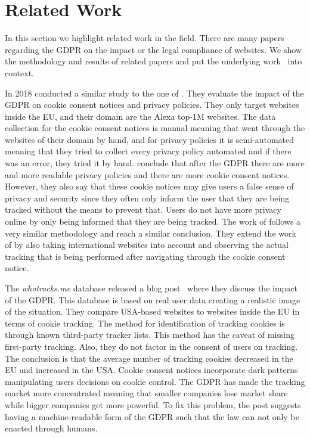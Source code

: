 \section{Related Work}
\label{sec:related}

In this section we highlight related work in the field. There are many papers regarding the GDPR on the impact or
the legal compliance of websites. We show the methodology and results of related papers and put the underlying
work~\cite{sanchez2019can} into context.

In 2018  conducted a similar study to the one of . They evaluate the impact of the
GDPR on cookie consent notices and privacy policies. They only target websites inside the EU, and their domain are the
Alexa top-1M websites. The data collection for the cookie consent notices is manual meaning that
\citeauthor{degeling2018we} went through the websites of their domain by hand, and for privacy policies it is
semi-automated meaning that they tried to collect every privacy policy automated and if there was an error, they tried
it by hand. \citeauthor{degeling2018we} conclude that after the GDPR there are more and more readable privacy policies
and there are more cookie consent notices. However, they also say that these cookie notices may give users a false sense
of privacy and security since they often only inform the user that they are being tracked without the means to prevent
that. Users do not have more privacy online by only being informed that they are being tracked. The work of
 follows a very similar methodology and reach a similar conclusion. They extend the work of
 by also taking international websites into account and observing the actual tracking that is being
performed after navigating through the cookie consent notice.

The \emph{whotracks.me} database released a blog post~\cite{whathappened} where they discuss the impact of the GDPR.
This database is based on real user data creating a realistic image of the situation. They compare USA-based websites to
websites inside the EU in terms of cookie tracking. The method for identification of tracking cookies is through known third-party
tracker lists. This method has the caveat of missing first-party tracking. Also, they do not factor in the consent of
users on tracking. The conclusion is that the average number of tracking cookies decreased in the EU and increased in
the USA. Cookie consent notices incorporate dark patterns manipulating users decisions on cookie control. The GDPR has
made the tracking market more concentrated meaning that smaller companies lose market share while bigger companies get
more powerful. To fix this problem, the post suggests having a machine-readable form of the GDPR such that the law can
not only be enacted through humans.


